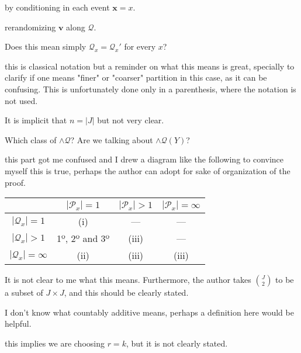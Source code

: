 \documentclass[12pt]{article}
\begin{document}
\begin{itemize}

by conditioning in each event $\mathbf{x} = x$.

rerandomizing $\mathbf{v}$ along $\mathcal Q$.


Does this mean simply $\mathcal Q_x  = \mathcal Q_x' $ for every $x$?


this is classical notation but a reminder on what this means is great, specially to clarify  if one means "finer" or "coarser" partition in this case, as it can be confusing.
This is unfortunately done only in a parenthesis, where the notation is not used.

It is implicit that $n = |J|$ but not very clear.

 Which class of $\mathcal \wedge \mathcal Q$? Are we talking about $\mathcal \wedge \mathcal Q(Y)$? 

 this part got me confused and I drew a diagram like the following to convince myself this is true, perhaps the author can adopt for sake of organization of the proof.

\begin{center}
\begin{tabular}{|c || c c c||} 
 \hline
  & $|\mathcal P_x| = 1$ &  $|\mathcal P_x| > 1$ & $|\mathcal P_x| = \infty$ \\ [0.5ex] 
 \hline\hline
 $|\mathcal Q_x| = 1$ & (i) & --- & --- \\ 
 \hline
 $|\mathcal Q_x| > 1$ & 1º, 2º and 3º & (iii) & --- \\
 \hline
 $|\mathcal Q_x| = \infty$ & (ii) &  (iii) & (iii) \\
 \hline
\end{tabular}
\end{center}

It is not clear to me what this means. Furthermore, the author takes $\binom{J}{2}$ to be a subset of $J\times J$, and this should be clearly stated.

I don't know what countably additive means, perhaps a definition here would be helpful.

 this implies we are choosing $r = k$, but it is not clearly stated.

\end{itemize}
\end{document}
